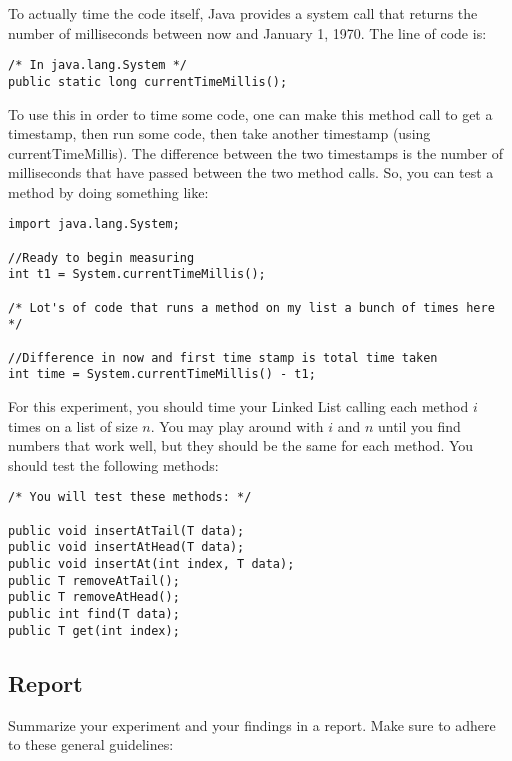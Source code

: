 \documentclass[paper=a4, fontsize=11pt, parskip=full]{scrartcl} %
\numberwithin{equation}{section} %
\numberwithin{figure}{section} %
\numberwithin{table}{section} %
\begin{document}
To actually time the code itself, Java provides a system call that returns the number of milliseconds between now and January 1, 1970. The line of code is:

\begin{lstlisting}
/* In java.lang.System */
public static long currentTimeMillis();
\end{lstlisting}

To use this in order to time some code, one can make this method call to get a timestamp, then run some code, then take another timestamp (using currentTimeMillis). The difference between the two timestamps is the number of milliseconds that have passed between the two method calls. So, you can test a method by doing something like:

\begin{lstlisting}
import java.lang.System;

//Ready to begin measuring
int t1 = System.currentTimeMillis();

/* Lot's of code that runs a method on my list a bunch of times here */

//Difference in now and first time stamp is total time taken
int time = System.currentTimeMillis() - t1;
\end{lstlisting}

For this experiment, you should time your Linked List calling each method $i$ times on a list of size $n$. You may play around with $i$ and $n$ until you find numbers that work well, but they should be the same for each method. You should test the following methods:

\begin{lstlisting}
/* You will test these methods: */

public void insertAtTail(T data);
public void insertAtHead(T data);
public void insertAt(int index, T data);
public T removeAtTail();
public T removeAtHead();
public int find(T data);
public T get(int index);
\end{lstlisting}

\subsection{Report}

Summarize your experiment and your findings in a report. Make sure to adhere to these general guidelines:
\end{document}

